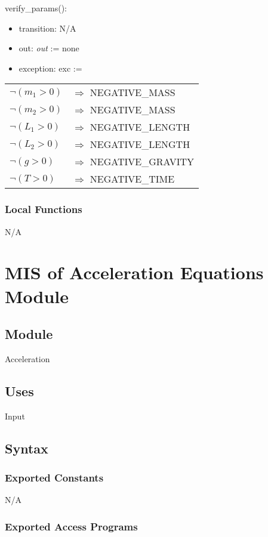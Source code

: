 \documentclass[12pt, titlepage]{article}
\begin{document}
\noindent verify\_params():
\begin{itemize}
\item transition: N/A
\item out: \textit{out} := none
\item exception: exc := 
\end{itemize}
\noindent \begin{longtable*}[l]{l l} 
$\neg (m_1 > 0)$ & $\Rightarrow$ NEGATIVE\_MASS\\
$\neg (m_2 > 0)$ & $\Rightarrow$ NEGATIVE\_MASS\\
$\neg (L_1 > 0)$ & $\Rightarrow$ NEGATIVE\_LENGTH\\
$\neg (L_2 > 0)$ & $\Rightarrow$ NEGATIVE\_LENGTH\\
$\neg (g > 0)$ & $\Rightarrow$ NEGATIVE\_GRAVITY\\
$\neg (T> 0)$ & $\Rightarrow$ NEGATIVE\_TIME\\
\end{longtable*}

\subsubsection{Local Functions}
N/A

\newpage


\section{MIS of Acceleration Equations Module} \label{AEModule} 
 
\subsection{Module}
Acceleration

\subsection{Uses}
Input

\subsection{Syntax}

\subsubsection{Exported Constants}
N/A

\subsubsection{Exported Access Programs}
\end{document}
